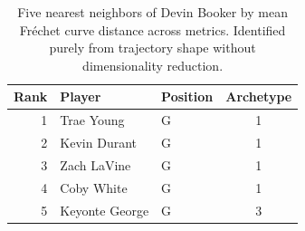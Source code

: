 \begin{table}[htbp]
  \centering\small
  \begin{tabular}{rllc}
    \toprule
    Rank & Player & Position & Archetype \\
    \midrule
    1 & Trae Young & G & 1 \\
    2 & Kevin Durant & G & 1 \\
    3 & Zach LaVine & G & 1 \\
    4 & Coby White & G & 1 \\
    5 & Keyonte George & G & 3 \\
    \bottomrule
  \end{tabular}
  \caption{Five nearest neighbors of Devin Booker by mean Fr\'{e}chet curve distance across metrics. Identified purely from trajectory shape without dimensionality reduction.}
  \label{tab:Devin_Booker_frechet_curve_neighbors}
\end{table}

